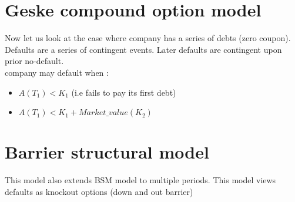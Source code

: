\section{Geske compound option model}
Now let us look at the case where company has a series of debts (zero coupon). Defaults are a series of contingent events. Later defaults are contingent upon prior no-default.\\
company may default when : 
\begin{itemize}
    \item $A(T_1)<K_1$ (i.e fails to pay its first debt)
    \item $A(T_1)<K_1+Market\_value(K_2)$
\end{itemize}

\section{Barrier structural model}
This model also extends BSM model to multiple periods. This model views defaults as knockout options (down and out barrier)

